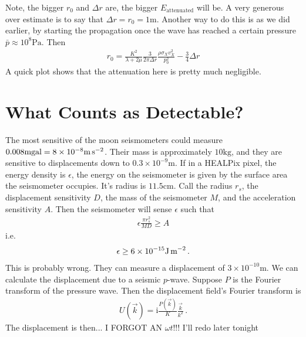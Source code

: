 \documentclass{article}
\newcommand*\te[1]{\text{#1}}
\newcommand*\f[2]{\frac{#1}{#2}}
\newcommand*\I{\te{i}}
\begin{document}
Note, the bigger $r_0$ and $\Delta r$ are, the bigger $E_{\te{attenuated}}$ will be. A very generous over estimate is to say that $\Delta r = r_0 = 1\te{m}$. Another way to do this is as we did earlier, by starting the propagation once the wave has reached a certain pressure $\bar p \approx 10^8\te{Pa}$. Then
\begin{align}
 r_0 = \f{K^2}{\lambda+2\mu} \f{3}{2\pi\Delta r}\f{\rho\sigma_Xv_X^2 }{p_0^2}-\f{3}{4}\Delta r
\end{align}
A quick plot shows that the attenuation here is pretty much negligible.
\pagebreak
\section{What Counts as Detectable?}
The most sensitive of the moon seismometers could measure $0.008\te{mgal}=8\times 10^{-8}\te{m\,s}^{-2}$. Their mass is approximately $10\te{kg}$, and they are sensitive to displacements down to $0.3\times 10^{-9}\te{m}$. If in a HEALPix pixel, the energy density is $\epsilon$, the energy on the seismometer is given by the surface area the seismometer occupies. It's radius is $11.5\te{cm}$. Call the radius $r_s$, the displacement sensitivity $D$, the mass of the seismometer $M$, and the acceleration sensitivity $A$. Then the seismometer will sense $\epsilon$ such that
\begin{align}
\epsilon\f{\pi r_s^2}{MD} \geq A
\end{align}
i.e.
\begin{align}
\epsilon \geq 6\times 10^{-15} \te{J\,m}^{-2}\,.
\end{align}
This is probably wrong. They can measure a displacement of $3\times 10^{-10}\te{m}$. We can calculate the displacement due to a seismic $p$-wave. Suppose $P$ is the Fourier transform of the pressure wave. Then the displacement field's Fourier transform is 
\begin{align}
U(\vec k) =\I\f{P(\vec k)}{K}\f{\vec k}{k^2}\,. 
\end{align}
The displacement is then... I FORGOT AN $\omega t$!!! I'll redo later tonight
\end{document}
